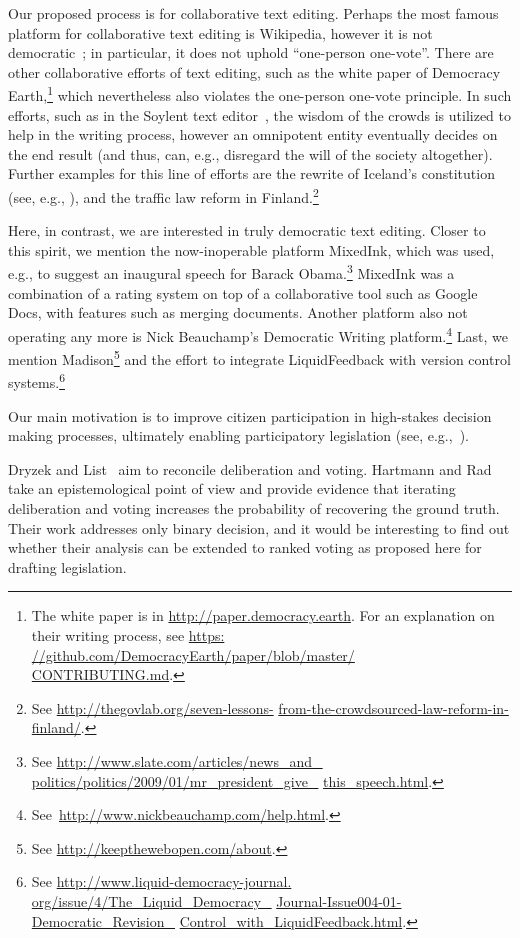 \documentclass[sigconf]{aamas}  %
\begin{document}
Our proposed process is for collaborative text editing.
Perhaps the most famous platform for collaborative text editing is Wikipedia, however it is not democratic~\cite{black2008wikipedia}; in particular, it does not uphold ``one-person one-vote''.
There are other collaborative efforts of text editing, such as the white paper of Democracy Earth,\footnote{The white paper is in \url{http://paper.democracy.earth}. For an explanation on their writing process, see \url{https:} \url{//github.com/DemocracyEarth/paper/blob/master/} \url{CONTRIBUTING.md}.}
which nevertheless also violates the one-person one-vote principle.
In such efforts, such as in the Soylent text editor~\cite{soylent},
the wisdom of the crowds is utilized to help in the writing process,
however an omnipotent entity eventually decides on the end result (and thus, can, e.g., disregard the will of the society altogether).
%
Further examples for this line of efforts are the rewrite of Iceland's constitution (see, e.g., \cite[page 18]{aitamurto2012crowdsourcing}),
and the traffic law reform in Finland.\footnote{See \url{http://thegovlab.org/seven-lessons-} \url{from-the-crowdsourced-law-reform-in-finland/}.}

Here, in contrast, we are interested in truly democratic text editing.
Closer to this spirit, we mention the now-inoperable platform MixedInk, which was used, e.g., to suggest an inaugural speech for Barack Obama.\footnote{See \url{http://www.slate.com/articles/news_and_} \url{politics/politics/2009/01/mr_president_give_} \url{this_speech.html}.}
MixedInk was a combination of a rating system on top of a collaborative tool such as Google Docs, with features such as merging documents.
Another platform also not operating any more is Nick Beauchamp's Democratic Writing platform.\footnote{See~\url{http://www.nickbeauchamp.com/help.html}.}
Last, we mention Madison\footnote{See \url{http://keepthewebopen.com/about}.}
and the effort to integrate LiquidFeedback with version control systems.\footnote{See \url{http://www.liquid-democracy-journal.} \url{org/issue/4/The_Liquid_Democracy_} \url{Journal-Issue004-01-Democratic_Revision_} \url{Control_with_LiquidFeedback.html}.}

Our main motivation is to improve citizen participation in high-stakes decision making processes, ultimately enabling participatory legislation (see, e.g.,~\cite{ochoa2008relationship}).

Dryzek and List~\cite{dryzek2003social} aim to reconcile deliberation and voting.  Hartmann and Rad~\cite{hartmann2018voting} take an epistemological point of view and provide evidence that iterating deliberation and voting increases the probability of recovering the ground truth.  Their work addresses only binary decision, and it would be interesting to find out whether their analysis can be extended to ranked voting as proposed here for drafting legislation.
\end{document}
